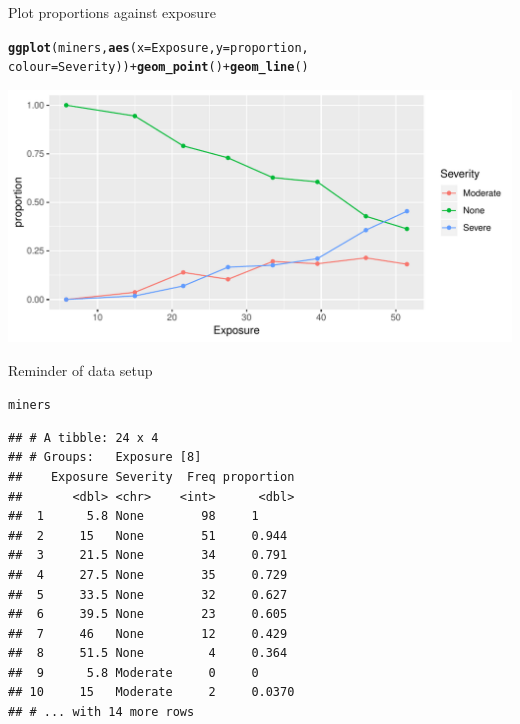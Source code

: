 \documentclass[unknownkeysallowed]{beamer}\usepackage[]{graphicx}\usepackage[]{color}
\makeatletter
\def\maxwidth{ %
  \ifdim\Gin@nat@width>\linewidth
    \linewidth
  \else
    \Gin@nat@width
  \fi
}
\newcommand{\hlopt}[1]{\textcolor[rgb]{0,0,0}{#1}}%
\newcommand{\hlstd}[1]{\textcolor[rgb]{0.345,0.345,0.345}{#1}}%
\newcommand{\hlkwc}[1]{\textcolor[rgb]{0.333,0.667,0.333}{#1}}%
\newcommand{\hlkwd}[1]{\textcolor[rgb]{0.737,0.353,0.396}{\textbf{#1}}}%
\newenvironment{kframe}{%
 \def\at@end@of@kframe{}%
 \ifinner\ifhmode%
  \def\at@end@of@kframe{\end{minipage}}%
  \begin{minipage}{\columnwidth}%
 \fi\fi%
 \def\FrameCommand##1{\hskip\@totalleftmargin \hskip-\fboxsep
 \colorbox{shadecolor}{##1}\hskip-\fboxsep
     \hskip-\linewidth \hskip-\@totalleftmargin \hskip\columnwidth}%
 \MakeFramed {\advance\hsize-\width
   \@totalleftmargin\z@ \linewidth\hsize
   \@setminipage}}%
 {\par\unskip\endMakeFramed%
 \at@end@of@kframe}
\newenvironment{knitrout}{}{} %
\makeatother
\begin{document}
\begin{frame}[fragile]{Plot proportions against exposure}
  
\begin{knitrout}\small
{}\color{fgcolor}\begin{kframe}
\begin{alltt}
\hlkwd{ggplot}\hlstd{(miners,}\hlkwd{aes}\hlstd{(}\hlkwc{x}\hlstd{=Exposure,}\hlkwc{y}\hlstd{=proportion,}
                  \hlkwc{colour}\hlstd{=Severity))}\hlopt{+}\hlkwd{geom_point}\hlstd{()}\hlopt{+}\hlkwd{geom_line}\hlstd{()}
\end{alltt}
\end{kframe}
\includegraphics[width=\maxwidth]{figure/unnamed-chunk-80-1} 

\end{knitrout}
  
\end{frame}

\begin{frame}[fragile]{Reminder of data setup}

  \begin{footnotesize}
\begin{knitrout}
\color{fgcolor}\begin{kframe}
\begin{alltt}
\hlstd{miners}
\end{alltt}
\begin{verbatim}
## # A tibble: 24 x 4
## # Groups:   Exposure [8]
##    Exposure Severity  Freq proportion
##       <dbl> <chr>    <int>      <dbl>
##  1      5.8 None        98     1     
##  2     15   None        51     0.944 
##  3     21.5 None        34     0.791 
##  4     27.5 None        35     0.729 
##  5     33.5 None        32     0.627 
##  6     39.5 None        23     0.605 
##  7     46   None        12     0.429 
##  8     51.5 None         4     0.364 
##  9      5.8 Moderate     0     0     
## 10     15   Moderate     2     0.0370
## # ... with 14 more rows
\end{verbatim}
\end{kframe}
\end{knitrout}
  \end{footnotesize}
\end{frame}
\end{document}
